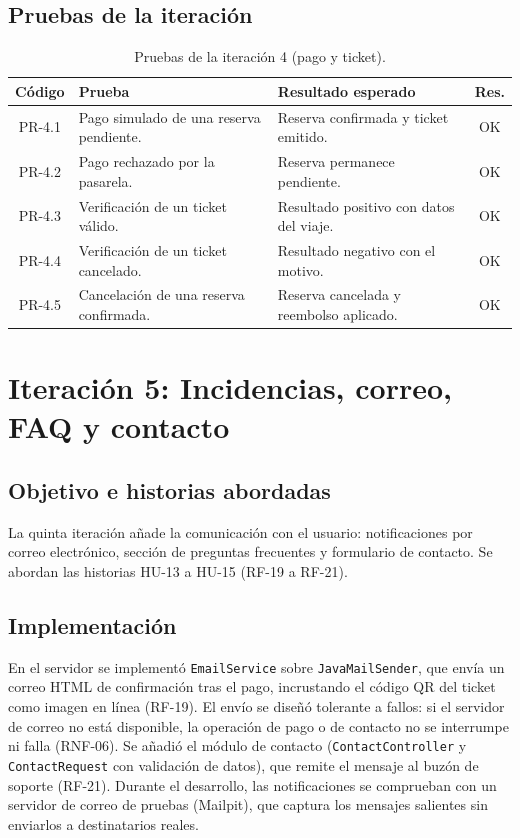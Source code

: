 \subsection{Pruebas de la iteración}

\begin{table}[h!]
\centering
\small
\begin{tabular}{|c|p{6.5cm}|p{5cm}|c|}
\hline
\textbf{Código} & \textbf{Prueba} & \textbf{Resultado esperado} & \textbf{Res.} \\ \hline
PR-4.1 & Pago simulado de una reserva pendiente. & Reserva confirmada y ticket emitido. & OK \\ \hline
PR-4.2 & Pago rechazado por la pasarela. & Reserva permanece pendiente. & OK \\ \hline
PR-4.3 & Verificación de un ticket válido. & Resultado positivo con datos del viaje. & OK \\ \hline
PR-4.4 & Verificación de un ticket cancelado. & Resultado negativo con el motivo. & OK \\ \hline
PR-4.5 & Cancelación de una reserva confirmada. & Reserva cancelada y reembolso aplicado. & OK \\ \hline
\end{tabular}
\caption{Pruebas de la iteración 4 (pago y ticket).}
\label{tab:pruebas-it4}
\end{table}


\section{Iteración 5: Incidencias, correo, FAQ y contacto}
\label{sec:iteracion-5}

\subsection{Objetivo e historias abordadas}

La quinta iteración añade la comunicación con el usuario: notificaciones por correo electrónico, sección de preguntas frecuentes y formulario de contacto. Se abordan las historias HU-13 a HU-15 (RF-19 a RF-21).

\subsection{Implementación}

En el servidor se implementó \texttt{EmailService} sobre \texttt{JavaMailSender}, que envía un correo HTML de confirmación tras el pago, incrustando el código QR del ticket como imagen en línea (RF-19). El envío se diseñó tolerante a fallos: si el servidor de correo no está disponible, la operación de pago o de contacto no se interrumpe ni falla (RNF-06). Se añadió el módulo de contacto (\texttt{ContactController} y \texttt{ContactRequest} con validación de datos), que remite el mensaje al buzón de soporte (RF-21). Durante el desarrollo, las notificaciones se comprueban con un servidor de correo de pruebas (Mailpit), que captura los mensajes salientes sin enviarlos a destinatarios reales.

